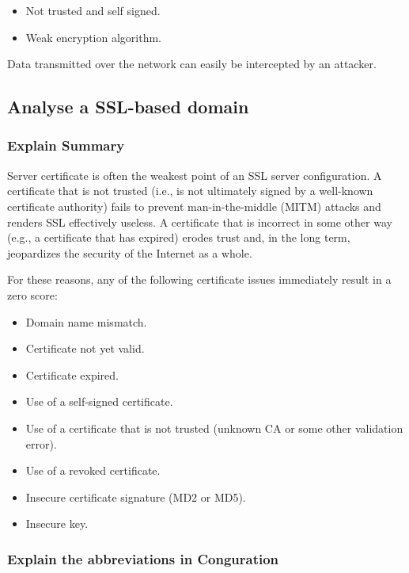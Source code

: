 \documentclass[14pt,a4paper,report]{report}
\begin{document}
\begin{itemize}
	\item Not trusted and self signed.
	\item Weak encryption algorithm.
\end{itemize}

Data transmitted over the network can easily be intercepted by an attacker.

\subsection{Analyse a SSL-based domain}

\subsubsection{Explain Summary}

Server certificate is often the weakest point of an SSL server configuration. A certificate that is not trusted (i.e., is not ultimately signed by a well-known certificate authority) fails to prevent man-in-the-middle (MITM) attacks and renders SSL effectively useless. A certificate that is incorrect in some other way (e.g., a certificate that has expired) erodes trust and, in the long term, jeopardizes the security of the Internet as a whole.

For these reasons, any of the following certificate issues immediately result in a zero score:

\begin{itemize}
	\item Domain name mismatch.
	\item Certificate not yet valid.
	\item Certificate expired.
	\item Use of a self-signed certificate.
	\item Use of a certificate that is not trusted (unknown CA or some other validation error).
	\item Use of a revoked certificate.
	\item Insecure certificate signature (MD2 or MD5).
	\item Insecure key.
\end{itemize}

\subsubsection{Explain the abbreviations in Conguration}
\end{document}
